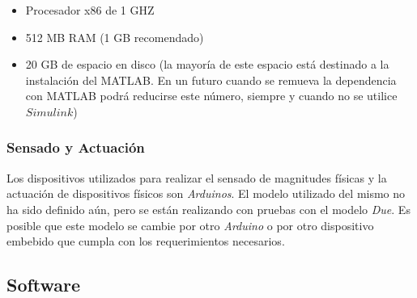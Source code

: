 \documentclass[a4paper,10pt]{article}
\begin{document}
        \begin{itemize}
            \item Procesador x86 de 1 GHZ
            \item 512 MB RAM (1 GB recomendado)
            \item 20 GB de espacio en disco (la mayoría de este espacio está destinado a la instalación del MATLAB. En un futuro cuando
                se remueva la dependencia con MATLAB podrá reducirse este número, siempre y cuando no se utilice $\mathit{Simulink}$)
        \end{itemize}

    \subsubsection{Sensado y Actuación}
        Los dispositivos utilizados para realizar el sensado de magnitudes físicas y la actuación de dispositivos físicos son 
        \textit{Arduinos}. El modelo utilizado del mismo no ha sido definido aún, pero se están realizando con pruebas con el modelo 
        \textit{Due}. Es posible que este modelo se cambie por otro \textit{Arduino} o por otro dispositivo embebido que cumpla con los
        requerimientos necesarios.

    \subsection{Software}
\end{document}
